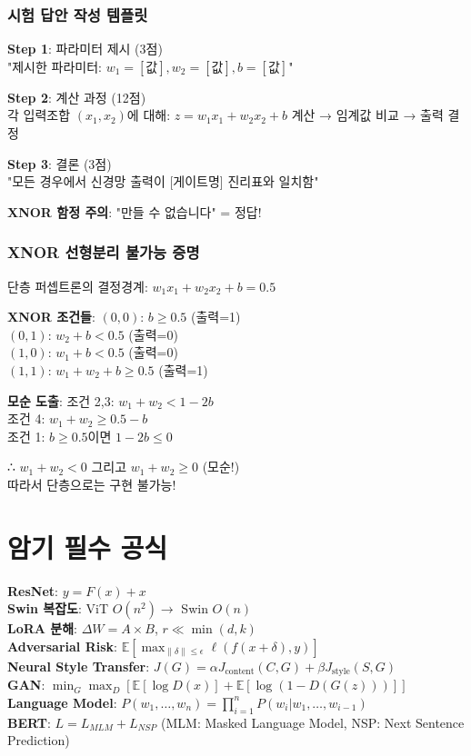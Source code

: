 \documentclass[6pt,landscape,a4paper]{article}
\begin{document}
\begin{multicols}{3}
\subsubsection{시험 답안 작성 템플릿}
\textbf{Step 1}: 파라미터 제시 (3점)\\
"제시한 파라미터: $w_1=[값], w_2=[값], b=[값]$"

\textbf{Step 2}: 계산 과정 (12점)\\
각 입력조합 $(x_1,x_2)$에 대해:
$z = w_1x_1 + w_2x_2 + b$ 계산 → 임계값 비교 → 출력 결정

\textbf{Step 3}: 결론 (3점)\\
"모든 경우에서 신경망 출력이 [게이트명] 진리표와 일치함"

\textbf{XNOR 함정 주의}: "만들 수 없습니다" = 정답!

\subsubsection{XNOR 선형분리 불가능 증명}
단층 퍼셉트론의 결정경계: $w_1x_1 + w_2x_2 + b = 0.5$

\textbf{XNOR 조건들}:
$(0,0)$: $b \geq 0.5$ (출력=1)\\
$(0,1)$: $w_2 + b < 0.5$ (출력=0)\\
$(1,0)$: $w_1 + b < 0.5$ (출력=0)\\
$(1,1)$: $w_1 + w_2 + b \geq 0.5$ (출력=1)

\textbf{모순 도출}:
조건 2,3: $w_1 + w_2 < 1 - 2b$\\
조건 4: $w_1 + w_2 \geq 0.5 - b$\\
조건 1: $b \geq 0.5$이면 $1-2b \leq 0$

∴ $w_1 + w_2 < 0$ 그리고 $w_1 + w_2 \geq 0$ (모순!)\\
따라서 단층으로는 구현 불가능!
\section{암기 필수 공식}
\textbf{ResNet}: $y = F(x) + x$ \\
\textbf{Swin 복잡도}: ViT $O(n^2) \rightarrow$ Swin $O(n)$ \\
\textbf{LoRA 분해}: $\Delta W = A \times B$, $r \ll \min(d,k)$ \\
\textbf{Adversarial Risk}: $\mathbb{E}[\max_{\|\delta\| \leq \epsilon} \ell(f(x + \delta), y)]$ \\
\textbf{Neural Style Transfer}: $J(G) = \alpha J_{\text{content}}(C,G) + \beta J_{\text{style}}(S,G)$ \\
\textbf{GAN}: $\min_G \max_D [\mathbb{E}[\log D(x)] + \mathbb{E}[\log(1-D(G(z)))]]$ \\
\textbf{Language Model}: $P(w_1, \ldots, w_n) = \prod_{i=1}^n P(w_i|w_1, \ldots, w_{i-1})$ \\
\textbf{BERT}: $L = L_{MLM} + L_{NSP}$ (MLM: Masked Language Model, NSP: Next Sentence Prediction)


\end{multicols}
\end{document}
